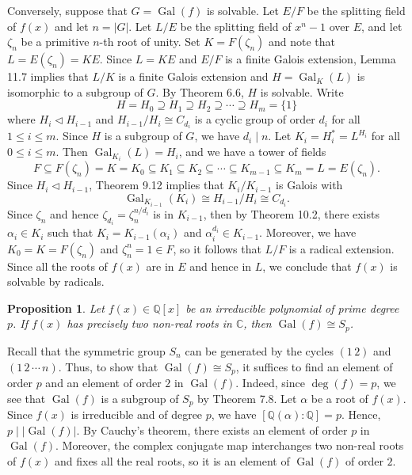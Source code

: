 \documentclass[10pt]{article}
\makeatletter
\newcommand{\C}{\mathbb{C}}
\newcommand{\Q}{\mathbb{Q}}
\newcommand{\norm}{\triangleleft}
\DeclareMathOperator{\Gal}{Gal}
\theoremstyle{newstyle}
\newtheorem{prop}[thm]{Proposition}
\newenvironment{pf}[1][\proofname]{\par
  \pushQED{\qed}%
  \normalfont \topsep0\p@\relax
  \trivlist
  \item[\hskip\labelsep\scshape
  #1\@addpunct{.}]\ignorespaces
}{%
  \popQED\endtrivlist\@endpefalse
}
\makeatother
\begin{document}
\begin{pf}
\newpage 
Conversely, suppose that $G = \Gal(f)$ is solvable. Let $E/F$ be the splitting field of $f(x)$ 
and let $n = |G|$. Let $L/E$ be the splitting field of $x^n-1$ over $E$, and let 
$\zeta_n$ be a primitive $n$-th root of unity. Set $K = F(\zeta_n)$ and note that $L = E(\zeta_n) = 
KE$. Since $L = KE$ and $E/F$ is a finite Galois extension, Lemma 11.7 implies that $L/K$ is a 
finite Galois extension and $H = \Gal_K(L)$ is isomorphic to a subgroup of $G$. By Theorem 6.6, 
$H$ is solvable. Write 
\[ H = H_0 \supseteq H_1 \supseteq H_2 \supseteq \cdots \supseteq H_m = \{1\} \]
where $H_i \norm H_{i-1}$ and $H_{i-1}/H_i \cong C_{d_i}$ is a cyclic group of order $d_i$ 
for all $1 \leq i \leq m$. Since $H$ is a subgroup of $G$, we have $d_i \mid n$. Let 
$K_i = H_i^* = L^{H_i}$ for all $0 \leq i \leq m$. Then $\Gal_{K_i}(L) = H_i$, and we have a tower of 
fields 
\[ F \subseteq F(\zeta_n) = K = K_0 \subseteq K_1 \subseteq K_2 \subseteq \cdots \subseteq 
K_{m-1} \subseteq K_m = L = E(\zeta_n). \]
Since $H_i \norm H_{i-1}$, Theorem 9.12 implies that $K_i/K_{i-1}$ is Galois with 
\[ \Gal_{K_{i-1}}(K_i) \cong H_{i-1}/H_i \cong C_{d_i}. \]
Since $\zeta_n$ and hence $\zeta_{d_i} = \zeta_n^{n/d_i}$ is in $K_{i-1}$, then by Theorem 10.2, 
there exists $\alpha_i \in K_i$ such that $K_i = K_{i-1}(\alpha_i)$ and $\alpha_i^{d_i} 
\in K_{i-1}$. Moreover, we have $K_0 = K = F(\zeta_n)$ and $\zeta_n^n = 1 \in F$, so it follows that 
$L/F$ is a radical extension. Since all the roots of $f(x)$ are in $E$ and hence in $L$, 
we conclude that $f(x)$ is solvable by radicals. 
\end{pf}

\begin{prop}
Let $f(x) \in \Q[x]$ be an irreducible polynomial of prime degree $p$. If $f(x)$ has 
precisely two non-real roots in $\C$, then $\Gal(f) \cong S_p$. 
\end{prop}
\begin{pf}
Recall that the symmetric group $S_n$ can be generated by the cycles $(1\,2)$ and 
$(1\,2\,\cdots\,n)$. Thus, to show that $\Gal(f) \cong S_p$, it suffices to find 
an element of order $p$ and an element of order $2$ in $\Gal(f)$. Indeed, since 
$\deg(f) = p$, we see that $\Gal(f)$ is a subgroup of $S_p$ by Theorem 7.8. Let 
$\alpha$ be a root of $f(x)$. Since $f(x)$ is irreducible and of degree $p$, we have 
$[\Q(\alpha) : \Q] = p$. Hence, $p \mid \lvert\Gal(f)\rvert$. By Cauchy's theorem, 
there exists an element of order $p$ in $\Gal(f)$. Moreover, the complex conjugate map 
interchanges two non-real roots of $f(x)$ and fixes all the real roots, so it is 
an element of $\Gal(f)$ of order $2$. 
\end{pf}
\end{document}
